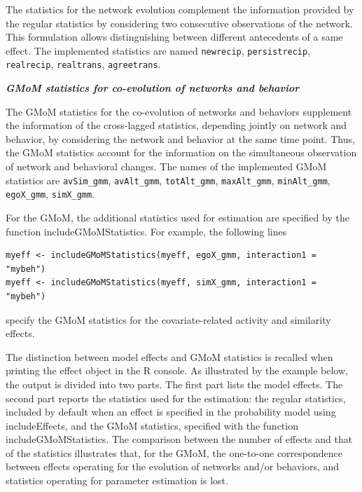 \documentclass[a4paper,fleqn,11pt]{article}
\newcommand{\+}{\, + \,}
\newcommand{\sfn}[1]{\textsf{#1}}
\begin{document}
The statistics for the network evolution \citep{ASS2015}
complement the information provided by the regular statistics by
considering two consecutive observations of the network.
This formulation allows distinguishing between different antecedents of a same effect.
The implemented statistics are named \texttt{newrecip}, \texttt{persistrecip}, \texttt{realrecip},
\texttt{realtrans}, \texttt{agreetrans}.
\bigskip

\noindent
\textbf{\emph{GMoM statistics for co-evolution of networks and behavior }}
\medskip

The GMoM statistics for the co-evolution of networks and behaviors \citep{ASS2019}
supplement the information of the cross-lagged statistics, depending jointly
on network and behavior, by considering the network and behavior at the same time point.
Thus, the GMoM statistics account for the information on the simultaneous observation
of network and behavioral changes. The names of the implemented GMoM statistics
are \texttt{avSim\_gmm}, \texttt{avAlt\_gmm}, \texttt{totAlt\_gmm}, \texttt{maxAlt\_gmm},
\texttt{minAlt\_gmm}, \texttt{egoX\_gmm}, \texttt{simX\_gmm}.

For the GMoM, the additional statistics used for estimation are specified by
the function \sfn{includeGMoMStatistics}. For example, the following lines
\begin{verbatim}
myeff <- includeGMoMStatistics(myeff, egoX_gmm, interaction1 = "mybeh")
myeff <- includeGMoMStatistics(myeff, simX_gmm, interaction1 = "mybeh")
\end{verbatim}
specify the GMoM statistics for the covariate-related activity and similarity effects.

The distinction between model effects
and GMoM statistics is recalled when printing the effect object in the R console.
As illustrated by the example below, the output is divided into two parts.
The first part lists the model effects.
The second part reports the statistics used for the estimation:
the regular statistics, included by default when an effect is specified
in the probability model using \sfn{includeEffects},
and the GMoM statistics, specified with the function \sfn{includeGMoMStatistics}.
The comparison between the number of effects and that of the statistics
illustrates that, for the GMoM, the one-to-one correspondence
between effects operating for the evolution of networks and/or behaviors,
and statistics operating for parameter estimation is lost.
\end{document}
